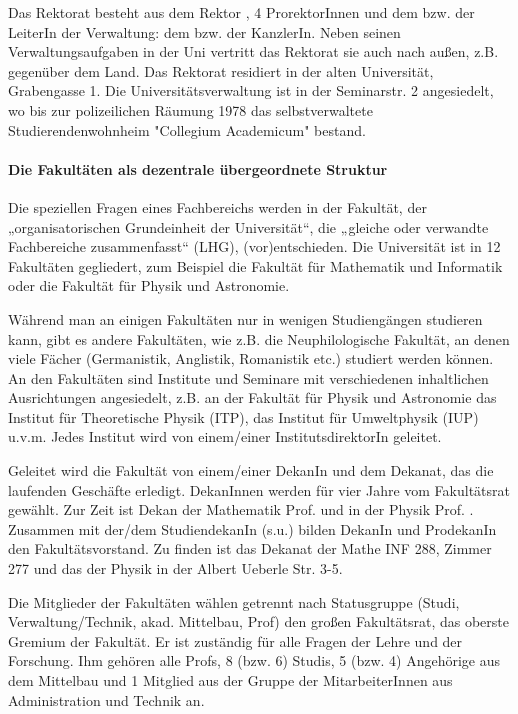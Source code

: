 Das Rektorat besteht aus dem Rektor \rektor, 4 ProrektorInnen und dem bzw. der LeiterIn der Verwaltung: dem bzw. der KanzlerIn. Neben seinen Verwaltungsaufgaben in der Uni vertritt das Rektorat sie auch nach außen, z.B. gegenüber dem Land. Das Rektorat residiert in der alten Universität, Grabengasse 1.
Die Universitätsverwaltung ist in der Seminarstr. 2 angesiedelt, wo bis zur polizeilichen Räumung 1978 das selbstverwaltete Studierendenwohnheim "Collegium Academicum" bestand.


\paragraph{Die Fakultäten als dezentrale übergeordnete Struktur}

Die speziellen Fragen eines Fachbereichs werden in der Fakultät, der
„organisatorischen Grundeinheit der Universität“, die „gleiche oder
verwandte Fachbereiche zusammenfasst“ (LHG), (vor)entschieden. Die
Universität ist in 12 Fakultäten gegliedert, zum Beispiel die Fakultät für
Mathematik und Informatik oder die Fakultät für Physik und Astronomie.

Während man an einigen Fakultäten nur in wenigen Studiengängen studieren
kann, gibt es andere Fakultäten, wie z.B. die Neuphilologische Fakultät,
an denen viele Fächer (Germanistik, Anglistik, Romanistik etc.) studiert
werden können. An den Fakultäten sind Institute und Seminare mit verschiedenen inhaltlichen Ausrichtungen angesiedelt, z.B. an der Fakultät für Physik und Astronomie das Institut für Theoretische Physik (ITP), das Institut für Umweltphysik (IUP) u.v.m. Jedes Institut wird von einem/einer InstitutsdirektorIn geleitet.

Geleitet wird die Fakultät von einem/einer DekanIn und dem Dekanat, das die laufenden Geschäfte erledigt. DekanInnen werden für vier Jahre vom Fakultätsrat gewählt. Zur Zeit ist Dekan der Mathematik Prof. \dekanmathe{} und in der Physik Prof. \dekanphysik. Zusammen mit der/dem
StudiendekanIn (s.u.) bilden DekanIn und ProdekanIn den Fakultätsvorstand. Zu finden ist das Dekanat der Mathe \gls{INF} 288, Zimmer 277 und das der Physik in der Albert Ueberle Str. 3-5.

Die Mitglieder der Fakultäten wählen getrennt nach Statusgruppe (Studi, Verwaltung/Technik, akad. Mittelbau, Prof) den großen Fakultätsrat, das oberste Gremium der Fakultät. Er ist zuständig für alle Fragen der Lehre und der Forschung. Ihm gehören alle Profs, 8 (bzw. 6) Studis, 5 (bzw. 4) Angehörige aus dem Mittelbau und 1 Mitglied aus der Gruppe der MitarbeiterInnen aus Administration und Technik an.

